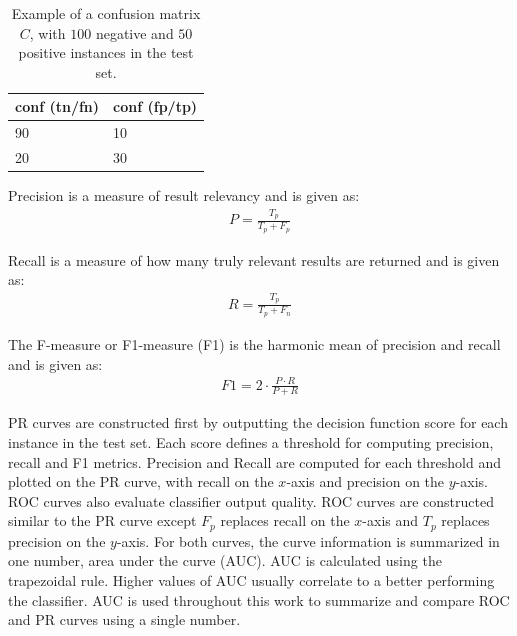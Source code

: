 \documentclass[ms]{nuthesis}
\begin{document}
\FloatBarrier
\begin{table}[H]
\centering
\caption{Example of a confusion matrix $C$, with $100$ negative and $50$ positive instances in the test set.}
\label{tab:confEx}
\begin{tabular}{|l||l|}\toprule
conf (tn/fn) & conf (fp/tp) \\ \midrule
90 & 10 \\ \midrule
20 & 30 \\ \bottomrule
\end{tabular}
\end{table}
\FloatBarrier


Precision is a measure of result relevancy and is given as: %
\FloatBarrier
\begin{equation}
\label{eq:precision}
\begin{aligned}
P = \frac{T_p}{T_p+F_p}
\end{aligned}
\end{equation}
\FloatBarrier

Recall is a measure of how many truly relevant results are returned and is given as: %
\FloatBarrier
\begin{equation}
\label{eq:recall}
\begin{aligned}
R = \frac{T_p}{T_p+F_n}
\end{aligned}
\end{equation}
\FloatBarrier

The F-measure or F1-measure (F1) is the harmonic mean of precision and recall and is given as: %
\FloatBarrier
\begin{equation}
\label{eq:fmes}
\begin{aligned}
F1 = 2\cdot \frac{P \cdot R}{P+R}
\end{aligned}
\end{equation}
\FloatBarrier

\par PR curves are constructed first by outputting the decision function score for each instance
in the test set. Each score defines a threshold for computing precision, recall and F1 metrics.
Precision and Recall are computed for each threshold and plotted on the PR curve,
with recall on the $x$-axis and precision on the $y$-axis. ROC curves also evaluate classifier output
quality. ROC curves are constructed similar to the PR curve except $F_p$ replaces recall on the
 $x$-axis and $T_p$ replaces precision on the $y$-axis. For both curves, the curve information is
 summarized in one number, area under the curve (AUC). AUC is calculated using the trapezoidal rule.
 Higher values of AUC usually correlate to a better performing the classifier. AUC is used throughout
 this work to summarize and compare ROC and PR curves using a single number.
\end{document}
